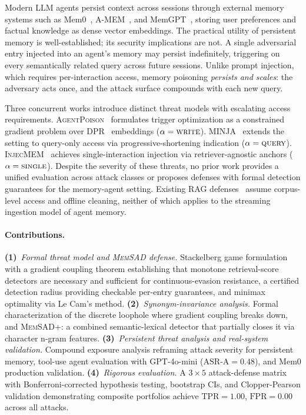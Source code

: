 \documentclass{article}
\theoremstyle{definition}
\newcommand{\asra}{\text{ASR-A}}
\newcommand{\tpr}{\text{TPR}}
\newcommand{\fpr}{\text{FPR}}
\newcommand{\memsad}{\textnormal{\textsc{MemSAD}}}
\newcommand{\agentpoison}{\textsc{AgentPoison}}
\newcommand{\minja}{\textsc{MINJA}}
\newcommand{\injecmem}{\textsc{InjecMEM}}
\begin{document}
Modern LLM agents persist context across sessions through external memory systems such as Mem0~\citep{mem0}, A-MEM~\citep{amem}, and MemGPT~\citep{memgpt2023}, storing user preferences and factual knowledge as dense vector embeddings.
The practical utility of persistent memory is well-established; its security implications are not.
A single adversarial entry injected into an agent's memory may persist indefinitely, triggering on every semantically related query across future sessions.
Unlike prompt injection, which requires per-interaction access, memory poisoning \emph{persists and scales}: the adversary acts once, and the attack surface compounds with each new query.

Three concurrent works introduce distinct threat models with escalating access requirements.
\agentpoison{}~\citep{chen2024agentpoison} formulates trigger optimization as a constrained gradient problem over DPR~\citep{karpukhin2020dense} embeddings ($\alpha = \textsc{write}$).
\minja{}~\citep{dong2025minja} extends the setting to query-only access via progressive-shortening indication ($\alpha = \textsc{query}$).
\injecmem{}~\citep{injecmem2026} achieves single-interaction injection via retriever-agnostic anchors ($\alpha = \textsc{single}$).
Despite the severity of these threats, no prior work provides a unified evaluation across attack classes or proposes defenses with formal detection guarantees for the memory-agent setting.
Existing RAG defenses~\citep{zou2024poisonedrag, chaudhari2024phantom, xiang2024robustrag} assume corpus-level access and offline cleaning, neither of which applies to the streaming ingestion model of agent memory.

\paragraph{Contributions.}
\textbf{(1)}~\emph{Formal threat model and \memsad{} defense.} Stackelberg game formulation with a gradient coupling theorem establishing that monotone retrieval-score detectors are necessary and sufficient for continuous-evasion resistance, a certified detection radius providing checkable per-entry guarantees, and minimax optimality via Le Cam's method.
\textbf{(2)}~\emph{Synonym-invariance analysis.} Formal characterization of the discrete loophole where gradient coupling breaks down, and \memsad{}+: a combined semantic-lexical detector that partially closes it via character n-gram features.
\textbf{(3)}~\emph{Persistent threat analysis and real-system validation.} Compound exposure analysis reframing attack severity for persistent memory, tool-use agent evaluation with GPT-4o-mini ($\asra = 0.48$), and Mem0 production validation.
\textbf{(4)}~\emph{Rigorous evaluation.} A $3 \times 5$ attack-defense matrix with Bonferroni-corrected hypothesis testing, bootstrap CIs, and Clopper-Pearson validation demonstrating composite portfolios achieve $\tpr = 1.00$, $\fpr = 0.00$ across all attacks.
\end{document}
